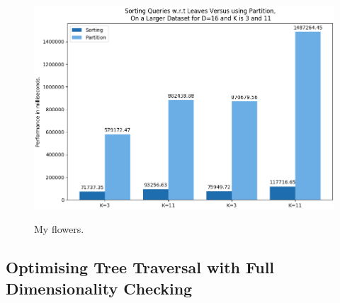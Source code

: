 \begin{figure}[H]
\centering
\includegraphics[width=1\textwidth]{pics/plot-figs/sort-d16.png}
\caption{}
\end{figure}

\begin{figure}[H]
  \centering
  \caption{My flowers.}
\end{figure}






\subsection{Optimising Tree Traversal with Full Dimensionality Checking}

